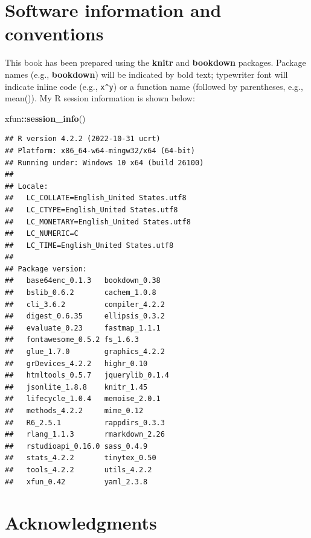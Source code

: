 \documentclass[
]{krantz}
\makeatletter
\newenvironment{Shaded}{\begin{snugshade}}{\end{snugshade}}
\newcommand{\FunctionTok}[1]{\textcolor[rgb]{0.27,0.27,0.27}{\textbf{#1}}}
\newcommand{\NormalTok}[1]{#1}
\newcommand{\SpecialCharTok}[1]{\textcolor[rgb]{0.43,0.43,0.43}{\textbf{#1}}}
\newenvironment{kframe}{%
\medskip{}
\setlength{\fboxsep}{.8em}
 \def\at@end@of@kframe{}%
 \ifinner\ifhmode%
  \def\at@end@of@kframe{\end{minipage}}%
  \begin{minipage}{\columnwidth}%
 \fi\fi%
 \def\FrameCommand##1{\hskip\@totalleftmargin \hskip-\fboxsep
 \colorbox{shadecolor}{##1}\hskip-\fboxsep
     \hskip-\linewidth \hskip-\@totalleftmargin \hskip\columnwidth}%
 \MakeFramed {\advance\hsize-\width
   \@totalleftmargin\z@ \linewidth\hsize
   \@setminipage}}%
 {\par\unskip\endMakeFramed%
 \at@end@of@kframe}
\renewenvironment{Shaded}{\begin{kframe}}{\end{kframe}}
\makeatother
\begin{document}
\hypertarget{software-information-and-conventions}{%
\section*{Software information and conventions}\label{software-information-and-conventions}}


This book has been prepared using the \textbf{knitr} \citep{xie2015} and \textbf{bookdown} \citep{R-bookdown} packages. Package names (e.g., \textbf{bookdown}) will be indicated by bold text; typewriter font will indicate inline code (e.g., \texttt{x\^{}y}) or a function name (followed by parentheses, e.g., mean()). My R session information is shown below:

\begin{Shaded}
\begin{Highlighting}[]
\NormalTok{xfun}\SpecialCharTok{::}\FunctionTok{session\_info}\NormalTok{()}
\end{Highlighting}
\end{Shaded}

\begin{verbatim}
## R version 4.2.2 (2022-10-31 ucrt)
## Platform: x86_64-w64-mingw32/x64 (64-bit)
## Running under: Windows 10 x64 (build 26100)
## 
## Locale:
##   LC_COLLATE=English_United States.utf8 
##   LC_CTYPE=English_United States.utf8   
##   LC_MONETARY=English_United States.utf8
##   LC_NUMERIC=C                          
##   LC_TIME=English_United States.utf8    
## 
## Package version:
##   base64enc_0.1.3   bookdown_0.38    
##   bslib_0.6.2       cachem_1.0.8     
##   cli_3.6.2         compiler_4.2.2   
##   digest_0.6.35     ellipsis_0.3.2   
##   evaluate_0.23     fastmap_1.1.1    
##   fontawesome_0.5.2 fs_1.6.3         
##   glue_1.7.0        graphics_4.2.2   
##   grDevices_4.2.2   highr_0.10       
##   htmltools_0.5.7   jquerylib_0.1.4  
##   jsonlite_1.8.8    knitr_1.45       
##   lifecycle_1.0.4   memoise_2.0.1    
##   methods_4.2.2     mime_0.12        
##   R6_2.5.1          rappdirs_0.3.3   
##   rlang_1.1.3       rmarkdown_2.26   
##   rstudioapi_0.16.0 sass_0.4.9       
##   stats_4.2.2       tinytex_0.50     
##   tools_4.2.2       utils_4.2.2      
##   xfun_0.42         yaml_2.3.8
\end{verbatim}

\hypertarget{acknowledgments}{%
\section*{Acknowledgments}\label{acknowledgments}}
\end{document}
